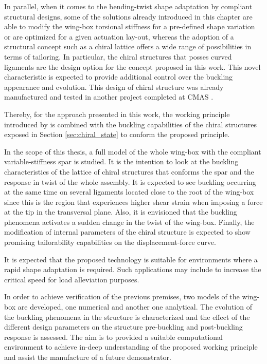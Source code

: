   In parallel, when it comes to the bending-twist shape adaptation by compliant structural designs, some of the solutions already introduced in this chapter are able to modify the wing-box torsional stiffness for a pre-defined shape variation or are optimized for a given actuation lay-out, whereas the adoption of a structural concept such as a chiral lattice offers a wide range of possibilities in terms of tailoring. In particular, the chiral structures that posses curved ligaments are the design option for the concept proposed in this work. This novel characteristic is expected to provide additional control over the buckling appearance and evolution. This design of chiral structure was already manufactured and tested in another project completed at CMAS \cite{Vincenz2017}.

  Thereby, for the approach presented in this work, the working principle introduced by \cite{Raither2013a} is combined with the buckling capabilities of the chiral structures exposed in Section \ref{sec:chiral_state} to conform the proposed principle. 

  In the scope of this thesis, a full model of the whole wing-box with the compliant variable-stiffness spar is studied. It is the intention to look at the buckling characteristics of the lattice of chiral structures that conforms the spar and the response in twist of the whole assembly. It is expected to see buckling occurring at the same time on several ligaments located close to the root of the wing-box since this is the region that experiences higher shear strain when imposing a force at the tip in the transversal plane. Also, it is envisioned that the buckling phenomena activates a sudden change in the twist of the wing-box. Finally, the modification of internal parameters of the chiral structure is expected to show promising tailorability capabilities on the displacement-force curve.

  It is expected that the proposed technology is suitable for environments where a rapid shape adaptation is required. Such applications may include to increase the critical speed for load alleviation purposes.

  In order to achieve verification of the previous premises, two models of the wing-box are developed, one numerical and another one analytical. The evolution of the buckling phenomena in the structure is characterized and the effect of the different design parameters on the structure pre-buckling and post-buckling response is assessed. The aim is to provided a suitable computational environment to achieve in-deep understanding of the proposed working principle and assist the manufacture of a future demonstrator.

